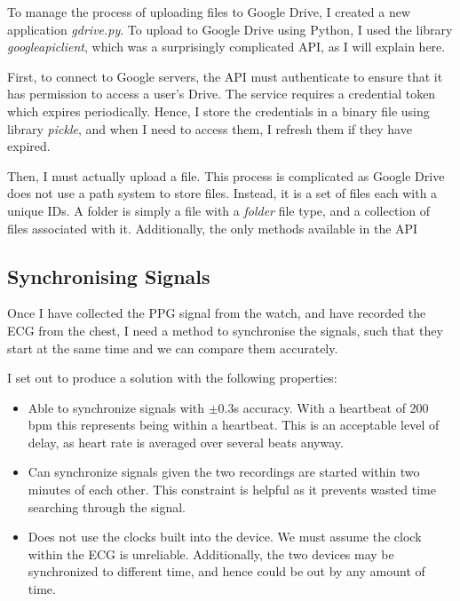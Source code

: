 \documentclass[12pt,a4paper,twoside,openright]{report}
\begin{document}
To manage the process of uploading files to Google Drive, I created a new
application \emph{gdrive.py}. To upload to Google Drive using Python, I used
the library \emph{googleapiclient}, which was a surprisingly complicated API,
as I will explain here.

First, to connect to Google servers, the API must authenticate to ensure that
it has permission to access a user's Drive. The service requires a credential
token which expires periodically. Hence, I store the credentials in a binary
file using library \emph{pickle}, and when I need to access them, I 
refresh them if they have expired.

Then, I must actually upload a file. This process is complicated as Google
Drive does not use a path system to store files. Instead, it is a set of files
each with a unique IDs. A folder is simply a file with a \emph{folder} file
type, and a collection of files associated with it. Additionally, the only
methods available in the API 


\subsection{Synchronising Signals} \label{section:sync}

Once I have collected the PPG signal from the watch, and have recorded the ECG
from the chest, I need a method to synchronise the signals, such that they
start at the same time and we can compare them accurately.

I set out to produce a solution with the following properties:
\begin{itemize}
	\item Able to synchronize signals with \(\pm0.3\)s accuracy. With a
		heartbeat of 200 bpm this represents being within a heartbeat.
		This is an acceptable level of delay, as heart rate is
		averaged over several beats anyway.

	\item Can synchronize signals given the two recordings are started
		within two minutes of each other. This constraint is helpful
		as it prevents wasted time searching through the signal.

	\item Does not use the clocks built into the device. We must assume
		the clock within the ECG is unreliable. Additionally, the two
		devices may be synchronized to different time, and hence could
		be out by any amount of time.
\end{itemize}
\end{document}
